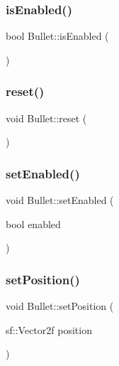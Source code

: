 \mbox{\label{class_bullet_a459d9d3adb6bdd2899965e1916eafb49}} 
\subsubsection{\texorpdfstring{is\+Enabled()}{isEnabled()}}
{\footnotesize\ttfamily bool Bullet\+::is\+Enabled (\begin{DoxyParamCaption}{ }\end{DoxyParamCaption})}

\mbox{\label{class_bullet_af2e8a6860232266f180efbdb2a68f8c9}} 
\subsubsection{\texorpdfstring{reset()}{reset()}}
{\footnotesize\ttfamily void Bullet\+::reset (\begin{DoxyParamCaption}{ }\end{DoxyParamCaption})}

\mbox{\label{class_bullet_a31f36da7eb69fdf357670f2ac7bbae85}} 
\subsubsection{\texorpdfstring{set\+Enabled()}{setEnabled()}}
{\footnotesize\ttfamily void Bullet\+::set\+Enabled (\begin{DoxyParamCaption}\item[{bool}]{enabled }\end{DoxyParamCaption})}

\mbox{\label{class_bullet_a143a06245534960d6af5ffb10b101750}} 
\subsubsection{\texorpdfstring{set\+Position()}{setPosition()}}
{\footnotesize\ttfamily void Bullet\+::set\+Position (\begin{DoxyParamCaption}\item[{sf\+::\+Vector2f}]{position }\end{DoxyParamCaption})}

